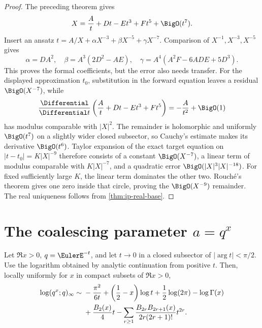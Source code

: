 \begin{proof}
The preceding theorem gives
\[
 X=\frac At+Dt-Et^3+Ft^5+\BigO(t^7).
\]
Insert an ansatz \(t=A/X+\alpha X^{-3}+\beta X^{-5}+\gamma X^{-7}\).
Comparison of \(X^{-1},X^{-3},X^{-5}\) gives
\[
 \alpha=DA^2,\quad
 \beta=A^3(2D^2-AE),\quad
 \gamma=A^4(A^2F-6ADE+5D^3).
\]
This proves the formal coefficients, but the error also needs transfer.
For the displayed approximation \(t_0\), substitution in the forward
equation leaves a residual \(\BigO(X^{-7})\), while
\[
 \frac{\Differential}{\Differential t}\left(\frac At+Dt-Et^3+Ft^5\right)
 =-\frac A{t^2}+\BigO(1)
\]
has modulus comparable with \(|X|^2\).  The remainder is holomorphic and
uniformly \(\BigO(t^7)\) on a slightly wider closed subsector, so Cauchy's
estimate makes its derivative \(\BigO(t^6)\).  Taylor expansion of the exact
target equation on
\(|t-t_0|=K|X|^{-9}\) therefore consists of a constant
\(\BigO(X^{-7})\), a linear term of modulus comparable with
\(K|X|^{-7}\), and a quadratic error
\(\BigO(|X|^3|X|^{-18})\).  For fixed sufficiently large \(K\), the linear
term dominates the other two.  Rouché's theorem gives one zero inside that
circle, proving the \(\BigO(X^{-9})\) remainder.  The real uniqueness follows
from \cref{thm:ip-real-base}.
\end{proof}

\section{\texorpdfstring{The coalescing parameter \(a=q^x\)}{The coalescing parameter a equals q to the x}}
\label{sec:ip-qx}

\begin{theorem}
\label{thm:ip-qx-expansion}
Let \(\Re x>0\), \(q=\EulerE^{-t}\), and let \(t\to0\) in a closed subsector of
\(|\arg t|<\pi/2\).  Use the logarithm obtained by analytic continuation from
positive \(t\).  Then, locally uniformly for \(x\) in compact subsets of
\(\Re x>0\),
\begin{align}
 \log(q^x;q)_\infty
 \sim{}&-\frac{\pi^2}{6t}
 +\left(\frac12-x\right)\log t
 +\frac12\log(2\pi)-\log\Gamma(x) \notag\\
 &+\frac{B_2(x)}4t
 -\sum_{r\geq1}
 \frac{B_{2r}B_{2r+1}(x)}{2r(2r+1)!}t^{2r}.
 \label{eq:ip-qx-expansion}
\end{align}
\end{theorem}

